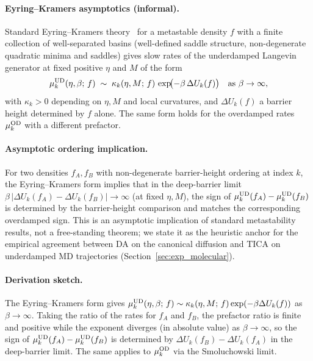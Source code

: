 \documentclass{article}
\begin{document}
\paragraph{Eyring--Kramers asymptotics (informal).}
Standard Eyring--Kramers theory~\cite{kramers1940,bovier_dh2015,nelson1967} for a metastable density $f$ with a finite collection of well-separated basins (well-defined saddle structure, non-degenerate quadratic minima and saddles) gives slow rates of the underdamped Langevin generator at fixed positive $\eta$ and $M$ of the form
\[
\mu_k^{\rm UD}(\eta, \beta;\, f) \;\sim\; \kappa_k(\eta, M;\, f)\,\exp\!\bigl(-\beta\,\Delta U_k(f)\bigr) \quad \text{as } \beta \to \infty,
\]
with $\kappa_k > 0$ depending on $\eta, M$ and local curvatures, and $\Delta U_k(f)$ a barrier height determined by $f$ alone. The same form holds for the overdamped rates $\mu_k^{\rm OD}$ with a different prefactor.

\paragraph{Asymptotic ordering implication.}
\label{cor:kinetic_ordering}
For two densities $f_A, f_B$ with non-degenerate barrier-height ordering at index $k$, the Eyring--Kramers form implies that in the deep-barrier limit $\beta\,|\Delta U_k(f_A) - \Delta U_k(f_B)| \to \infty$ (at fixed $\eta, M$), the sign of $\mu_k^{\rm UD}(f_A) - \mu_k^{\rm UD}(f_B)$ is determined by the barrier-height comparison and matches the corresponding overdamped sign. This is an asymptotic implication of standard metastability results, not a free-standing theorem; we state it as the heuristic anchor for the empirical agreement between DA on the canonical diffusion and TICA on underdamped MD trajectories (Section~\ref{sec:exp_molecular}).

\paragraph{Derivation sketch.}
The Eyring--Kramers form gives $\mu_k^{\rm UD}(\eta, \beta;\, f) \sim \kappa_k(\eta, M;\, f)\exp(-\beta \Delta U_k(f))$ as $\beta \to \infty$. Taking the ratio of the rates for $f_A$ and $f_B$, the prefactor ratio is finite and positive while the exponent diverges (in absolute value) as $\beta \to \infty$, so the sign of $\mu_k^{\rm UD}(f_A) - \mu_k^{\rm UD}(f_B)$ is determined by $\Delta U_k(f_B) - \Delta U_k(f_A)$ in the deep-barrier limit. The same applies to $\mu_k^{\rm OD}$ via the Smoluchowski limit.
\end{document}
